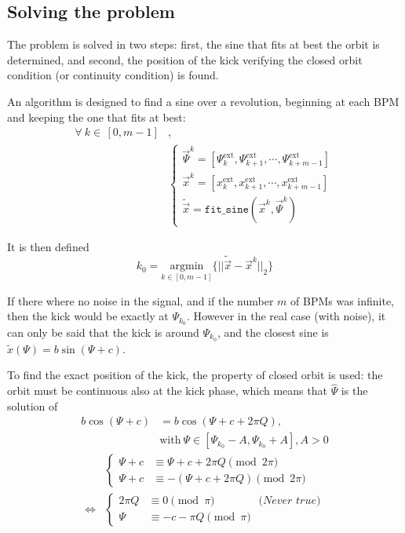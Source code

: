 \subsection{Solving the problem}

The problem is solved in two steps: first, the sine that fits at best the orbit is determined, and second, the position of the kick verifying the closed orbit condition (or continuity condition) is found.

An algorithm is designed to find a sine over a revolution, beginning at each BPM and keeping the one that fits at best:
\begin{align}
\forall~k \in \, [0,m-1]&, \nonumber \\
&\begin{cases}
\vec{\Psi}^k = \left[\Psi^\mathrm{ext}_{k}, \Psi^\mathrm{ext}_{k+1}, \cdots,  \Psi^\mathrm{ext}_{k+m-1}\right]\\
\vec{x}^k = \left[x^\mathrm{ext}_{k}, x^\mathrm{ext}_{k+1}, \cdots,  x^\mathrm{ext}_{k+m-1}\right]\\
\tilde{\vec{x}} = \mathtt{fit\_sine}\left(\vec{x}^k, \vec{\Psi}^k\right)
\end{cases}
\end{align}

It is then defined
\begin{equation}
k_0 = \underset{k \in [0, m-1]}{\textrm{argmin}}\{||\tilde{\vec{x}}-\vec{x}^k||_2\}
\end{equation}

If there where no noise in the signal, and if the number $m$ of BPMs was infinite, then the kick would be exactly at $\Psi_{k_0}$. However in the real case (with noise), it can only be said that the kick is around $\Psi_{k_0}$, and the closest sine is $\tilde{x}(\Psi) = b \sin(\Psi + c)$.

To find the exact position of the kick, the property of closed orbit is used: the orbit must be continuous also at the kick phase, which means that $\hat{\Psi}$ is the solution of
\begin{align}
b \cos(\Psi + c) &= b\cos(\Psi+c+2 \pi Q),\\
& \mathrm{with}~ \Psi \in [\Psi_{k_0}-A, \Psi_{k_0}+A] , A>0 \nonumber
\end{align}
\begin{align}
&\begin{cases}
\Psi + c &\equiv \Psi + c + 2 \pi Q \pmod{2 \pi} \\
\Psi + c &\equiv - (\Psi + c + 2 \pi Q) \pmod{2 \pi}
\end{cases} \nonumber\\
\iff &\begin{cases}
2 \pi Q &\equiv 0\pmod \pi \qquad\qquad\textit{(Never true)}\\
\Psi &\equiv -c - \pi Q  \pmod \pi
\end{cases} \nonumber
\end{align}

